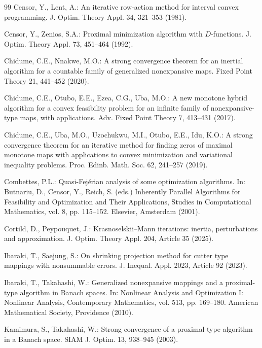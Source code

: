 \documentclass[leqno,12pt]{amsart}
\theoremstyle{definition}
\theoremstyle{remark}
\numberwithin{equation}{section}
\begin{document}
\begin{thebibliography}{99}
Censor, Y., Lent, A.: An iterative row-action method for interval convex programming. J. Optim. Theory Appl. 34, 321--353 (1981).

Censor, Y., Zenios, S.A.: Proximal minimization algorithm with $D$-functions. J. Optim. Theory Appl. 73, 451--464 (1992).

Chidume, C.E., Nnakwe, M.O.: A strong convergence theorem for an inertial algorithm for a countable family of generalized nonexpansive maps. Fixed Point Theory 21, 441--452 (2020).

Chidume, C.E., Otubo, E.E., Ezea, C.G., Uba, M.O.: A new monotone hybrid algorithm for a convex feasibility problem for an infinite family of nonexpansive-type maps, with applications. Adv. Fixed Point Theory 7, 413--431 (2017).

Chidume, C.E., Uba, M.O., Uzochukwu, M.I., Otubo, E.E., Idu, K.O.: A strong convergence theorem for an iterative method for finding zeros of maximal monotone maps with applications to convex minimization and variational inequality problems. Proc. Edinb. Math. Soc. 62, 241--257 (2019).

Combettes, P.L.: Quasi-Fej\'erian analysis of some optimization algorithms. In: Butnariu, D., Censor, Y., Reich, S. (eds.) Inherently Parallel Algorithms for Feasibility and Optimization and Their Applications, Studies in Computational Mathematics, vol. 8, pp. 115--152. Elsevier, Amsterdam (2001).

Cortild, D., Peypouquet, J.: Krasnoselskii--Mann iterations: inertia, perturbations and approximation. J. Optim. Theory Appl. 204, Article 35 (2025).

Ibaraki, T., Saejung, S.: On shrinking projection method for cutter type mappings with nonsummable errors. J. Inequal. Appl. 2023, Article 92 (2023).

Ibaraki, T., Takahashi, W.: Generalized nonexpansive mappings and a proximal-type algorithm in Banach spaces. In: Nonlinear Analysis and Optimization I: Nonlinear Analysis, Contemporary Mathematics, vol. 513, pp. 169--180. American Mathematical Society, Providence (2010).

Kamimura, S., Takahashi, W.: Strong convergence of a proximal-type algorithm in a Banach space. SIAM J. Optim. 13, 938--945 (2003).


\end{thebibliography}
\end{document}
